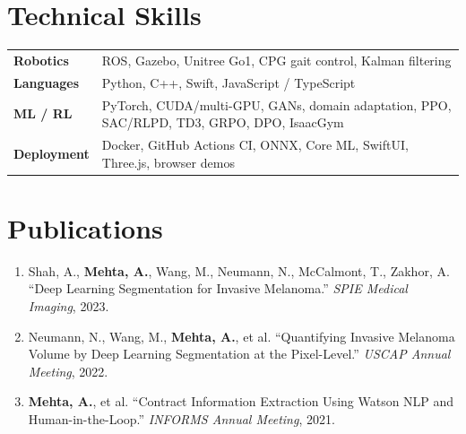\documentclass[10pt]{article}
\begin{document}
\section*{Technical Skills}
\begin{tabular}{@{}p{0.9in}l}
\textbf{Robotics} & ROS, Gazebo, Unitree Go1, CPG gait control, Kalman filtering \\
\textbf{Languages} & Python, C++, Swift, JavaScript / TypeScript \\
\textbf{ML / RL} & PyTorch, CUDA/multi-GPU, GANs, domain adaptation, PPO, SAC/RLPD, TD3, GRPO, DPO, IsaacGym \\
\textbf{Deployment} & Docker, GitHub Actions CI, ONNX, Core ML, SwiftUI, Three.js, browser demos \\
\end{tabular}

\section*{Publications}
\begin{enumerate}[leftmargin=1.4em,itemsep=1pt,topsep=1pt]
\item Shah, A., \textbf{Mehta, A.}, Wang, M., Neumann, N., McCalmont, T., Zakhor, A. ``Deep Learning Segmentation for Invasive Melanoma.'' \textit{SPIE Medical Imaging}, 2023.
\item Neumann, N., Wang, M., \textbf{Mehta, A.}, et al. ``Quantifying Invasive Melanoma Volume by Deep Learning Segmentation at the Pixel-Level.'' \textit{USCAP Annual Meeting}, 2022.
\item \textbf{Mehta, A.}, et al. ``Contract Information Extraction Using Watson NLP and Human-in-the-Loop.'' \textit{INFORMS Annual Meeting}, 2021.
\end{enumerate}
\end{document}
